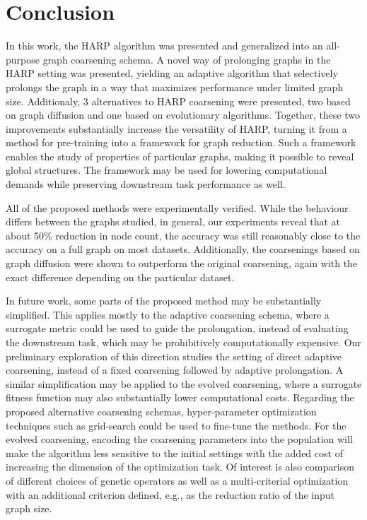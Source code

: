 \section{Conclusion}

In this work, the HARP algorithm was presented and generalized into an all-purpose graph coarsening schema. A novel way of prolonging graphs in the HARP setting was presented, yielding an adaptive algorithm that selectively prolongs the graph in a way that maximizes performance under limited graph size. Additionaly, 3 alternatives to HARP coarsening were presented, two based on graph diffusion and one based on evolutionary algorithms. Together, these two improvements substantially increase the versatility of HARP, turning it from a method for pre-training into a framework for graph reduction. Such a framework enables the study of properties of particular graphs, making it possible to reveal global structures. The framework may be used for lowering computational demands while preserving downstream task performance as well.

All of the proposed methods were experimentally verified. While the behaviour differs between the graphs studied, in general, our experiments reveal that at about 50\% reduction in node count, the accuracy was still reasonably close to the accuracy on a full graph on most datasets. Additionally, the coarsenings based on graph diffusion were shown to outperform the original coarsening, again with the exact difference depending on the particular dataset.

In future work, some parts of the proposed method may be substantially simplified. This applies mostly to the adaptive coarsening schema, where a surrogate metric could be used to guide the prolongation, instead of evaluating the downstream task, which may be prohibitively computationally expensive. Our preliminary exploration of this direction \cite{prochazka_downstream_2022} studies the setting of direct adaptive coarsening, instead of a fixed coarsening followed by adaptive prolongation. A similar simplification may be applied to the evolved coarsening, where a surrogate fitness function may also substantially lower computational costs. Regarding the proposed alternative coarsening schemas, hyper-parameter optimization techniques such as grid-search could be used to fine-tune the methods. For the evolved coarsening, encoding the coarsening parameters into the population will make the algorithm less sensitive to the initial settings with the added cost of increasing the dimension of the optimization task. Of interest is also comparison of different choices of genetic operators as well as a multi-criterial optimization with an additional criterion defined, e.g., as the reduction ratio of the input graph size.
